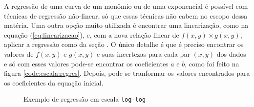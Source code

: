     A regressão de uma curva de um monômio ou de uma exponencial é possível com técnicas de regressão não-linear, só que essas técnicas não cabem no escopo dessa matéria. Uma outra opção muito utilizada é encontrar uma linearização, como na equação (\ref{eq:linearizacao}), e, com a nova relação linear de $f(x, y) \times g(x, y)$, aplicar a regressão como da seção . O único detalhe é que é preciso encontrar os valores de $f(x, y)$ e $g(x, y)$ e suas incertezas para cada par $(x, y)$ dos dados e só com esses valores pode-se encontrar os coeficientes $a$ e $b$, como foi feito na figura \ref{code:escala:regres}. Depois, pode se tranformar os valores encontrados para os coeficientes da equação inicial.

    \begin{figure}[H]
        \centering
        

        \caption{Exemplo de regressão em escala \texttt{log-log}}
        \label{fig:escala:regres}
    \end{figure}
